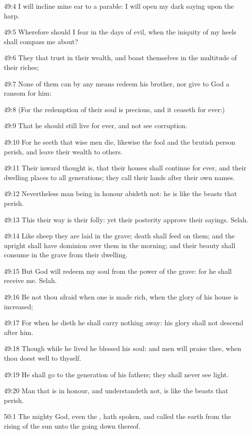 49:4 I will incline mine ear to a parable: I will open my dark saying upon the harp.

49:5 Wherefore should I fear in the days of evil, when the iniquity of my heels shall compass me about?

49:6 They that trust in their wealth, and boast themselves in the multitude of their riches;

49:7 None of them can by any means redeem his brother, nor give to God a ransom for him:

49:8 (For the redemption of their soul is precious, and it ceaseth for ever:)

49:9 That he should still live for ever, and not see corruption.

49:10 For he seeth that wise men die, likewise the fool and the brutish person perish, and leave their wealth to others.

49:11 Their inward thought is, that their houses shall continue for ever, and their dwelling places to all generations; they call their lands after their own names.

49:12 Nevertheless man being in honour abideth not: he is like the beasts that perish.

49:13 This their way is their folly: yet their posterity approve their sayings. Selah.

49:14 Like sheep they are laid in the grave; death shall feed on them; and the upright shall have dominion over them in the morning; and their beauty shall consume in the grave from their dwelling.

49:15 But God will redeem my soul from the power of the grave: for he shall receive me. Selah.

49:16 Be not thou afraid when one is made rich, when the glory of his house is increased;

49:17 For when he dieth he shall carry nothing away: his glory shall not descend after him.

49:18 Though while he lived he blessed his soul: and men will praise thee, when thou doest well to thyself.

49:19 He shall go to the generation of his fathers; they shall never see light.

49:20 Man that is in honour, and understandeth not, is like the beasts that perish.



50:1 The mighty God, even the \LORD, hath spoken, and called the earth from the rising of the sun unto the going down thereof.


